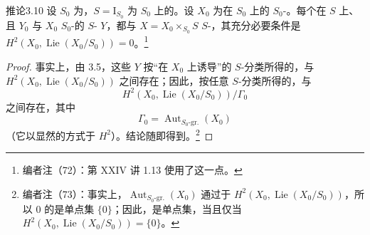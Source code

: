\begin{SGAresult}{推论}{3.10}
设 $S_0$ 为，$S=\mathrm I_{S_0}$ 为 $S_0$ 上的。设 $X_0$ 为在 $S_0$ 上的 $S_0$-。每个在 $S$ 上、且 $Y_0$ 与 $X_0$ $S_0$-的 $S$- $Y$，都与 $X=X_0\times_{S_0}S$ $S$-，其充分必要条件是 $H^2(X_0,\operatorname{Lie}(X_0/S_0))=0$。\footnote{编者注（72）：第 XXIV 讲 1.13 使用了这一点。}
\end{SGAresult}
\begin{proof}
事实上，由 3.5，这些 $Y$ 按“在 $X_0$ 上诱导”的 $S$-分类所得的，与 $H^2(X_0,\operatorname{Lie}(X_0/S_0))$ 之间存在；因此，按任意 $S$-分类所得的，与
\[
 H^2(X_0,\operatorname{Lie}(X_0/S_0))/\Gamma_0
\]
之间存在，其中
\[
 \Gamma_0=\operatorname{Aut}_{S_0\text{-gr.}}(X_0)
\]
（它以显然的方式于 $H^2$）。结论随即得到。\footnote{编者注（73）：事实上，$\operatorname{Aut}_{S_0\text{-gr.}}(X_0)$ 通过于 $H^2(X_0,\operatorname{Lie}(X_0/S_0))$，所以 $0$ 的是单点集 $\{0\}$；因此，是单点集，当且仅当 $H^2(X_0,\operatorname{Lie}(X_0/S_0))=\{0\}$。}
\end{proof}
